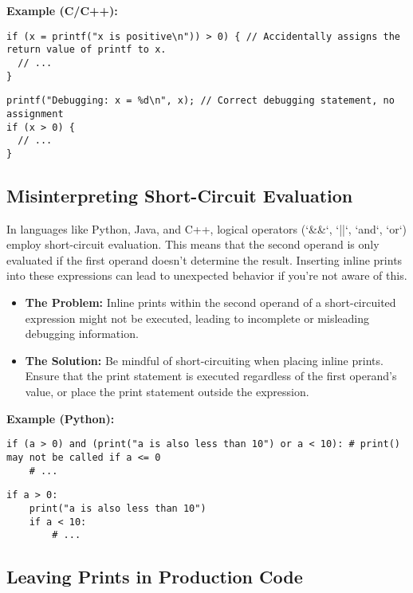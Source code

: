 \documentclass{article}
\begin{document}
{{{{{\bf Example (C/C++):}

\begin{verbatim}
if (x = printf("x is positive\n")) > 0) { // Accidentally assigns the return value of printf to x.
  // ...
}
\end{verbatim}

\begin{verbatim}
printf("Debugging: x = %d\n", x); // Correct debugging statement, no assignment
if (x > 0) {
  // ...
}
\end{verbatim}

\subsection*{Misinterpreting Short-Circuit Evaluation}

In languages like Python, Java, and C++, logical operators (`&&`, `||`, `and`, `or`) employ short-circuit evaluation.  This means that the second operand is only evaluated if the first operand doesn't determine the result. Inserting inline prints into these expressions can lead to unexpected behavior if you're not aware of this.

\begin{itemize}
    \item {\bf The Problem:} Inline prints within the second operand of a short-circuited expression might not be executed, leading to incomplete or misleading debugging information.
    \item {\bf The Solution:} Be mindful of short-circuiting when placing inline prints. Ensure that the print statement is executed regardless of the first operand's value, or place the print statement outside the expression.
\end{itemize}

{\bf Example (Python):}

\begin{verbatim}
if (a > 0) and (print("a is also less than 10") or a < 10): # print() may not be called if a <= 0
    # ...
\end{verbatim}

\begin{verbatim}
if a > 0:
    print("a is also less than 10")
    if a < 10:
        # ...
\end{verbatim}

\subsection*{Leaving Prints in Production Code}

}}}}
\end{document}
